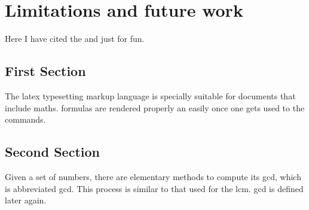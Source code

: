 \documentclass[../report.tex]{subfiles}
\begin{document}
	
	\chapter{Limitations and future work}
	
	Here I have cited the \cite{adxl} and \cite{kiburz1986bicycle} just for fun.\\
	
	\section{First Section}
	
	The \Gls{latex} typesetting markup language is specially suitable for documents that include \gls{maths}. \Glspl{formula} are rendered properly an easily once one gets used to the commands.
	
	\section{Second Section}
	\vspace{5mm}
	
	Given a set of numbers, there are elementary methods to compute its \acrlong{gcd}, which is abbreviated \acrshort{gcd}. This process is similar to that used for the \acrfull{lcm}. \acrshort{gcd} is defined later again.
\end{document}
